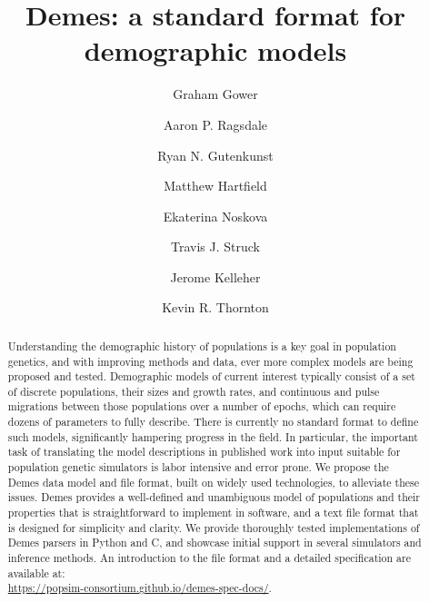 \documentclass[11pt]{article}
\begin{document}
\title{Demes: a standard format for demographic models}
\author[1,$\star$]{Graham Gower}
\author[2,$\star$]{Aaron P. Ragsdale}

\author[3]{Ryan N. Gutenkunst}
\author[4]{Matthew Hartfield}
\author[5]{Ekaterina Noskova}
\author[3]{Travis J. Struck}
\author[6,$\dagger$,$\aleph$]{Jerome Kelleher}
\author[7,$\dagger$]{Kevin R. Thornton}




\maketitle

\begin{abstract}
Understanding the demographic history of populations is a
key goal in population genetics, and with improving methods
and data, ever more complex models are being proposed and tested.
Demographic models of current interest
typically consist of a set of discrete populations,
their sizes and growth rates, and continuous and pulse migrations
between those populations over a number of epochs, which can require
dozens of parameters to fully describe. There is currently
no standard format to define such models, significantly
hampering  progress in the field. In particular, the important
task of translating the model descriptions in published
work into input suitable for population genetic simulators is labor intensive
and error prone.
We propose the Demes data model and file format,
built on widely used technologies,
to alleviate these issues. Demes provides a well-defined and unambiguous
model of populations and their properties that is straightforward to
implement in software, and a text file format that is designed for
simplicity and clarity.
We provide thoroughly tested implementations of Demes parsers in Python
and C, and showcase initial support in several simulators and inference
methods.
An introduction to the file format and a detailed specification are available at:\\
\url{https://popsim-consortium.github.io/demes-spec-docs/}.
\end{abstract}
\end{document}
